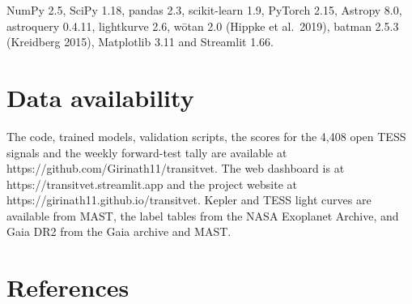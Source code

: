 \documentclass[
]{article}
\begin{document}
NumPy 2.5, SciPy 1.18, pandas 2.3, scikit-learn 1.9, PyTorch 2.15,
Astropy 8.0, astroquery 0.4.11, lightkurve 2.6, wōtan 2.0 (Hippke et
al.~2019), batman 2.5.3 (Kreidberg 2015), Matplotlib 3.11 and Streamlit
1.66.

\hypertarget{data-availability}{%
\section{Data availability}\label{data-availability}}

The code, trained models, validation scripts, the scores for the 4,408
open TESS signals and the weekly forward-test tally are available at
https://github.com/Girinath11/transitvet. The web dashboard is at
https://transitvet.streamlit.app and the project website at
https://girinath11.github.io/transitvet. Kepler and TESS light curves
are available from MAST, the label tables from the NASA Exoplanet
Archive, and Gaia DR2 from the Gaia archive and MAST.

\hypertarget{references}{%
\section{References}\label{references}}
\end{document}
